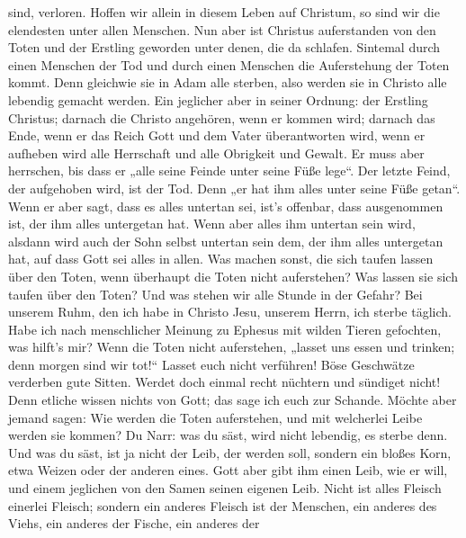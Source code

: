 sind, verloren.  Hoffen wir allein in diesem Leben auf
Christum, so sind wir die elendesten unter allen Menschen.
 Nun aber ist Christus auferstanden von den Toten und der
Erstling geworden unter denen, die da schlafen.  Sintemal
durch einen Menschen der Tod und durch einen Menschen die Auferstehung
der Toten kommt.  Denn gleichwie sie in Adam alle
sterben, also werden sie in Christo alle lebendig gemacht werden.
 Ein jeglicher aber in seiner Ordnung: der Erstling
Christus; darnach die Christo angehören, wenn er kommen wird;
 darnach das Ende, wenn er das Reich Gott und dem Vater
überantworten wird, wenn er aufheben wird alle Herrschaft und alle
Obrigkeit und Gewalt.  Er muss aber herrschen, bis dass
er „alle seine Feinde unter seine Füße lege``.  Der
letzte Feind, der aufgehoben wird, ist der Tod.  Denn „er
hat ihm alles unter seine Füße getan``. Wenn er aber sagt, dass es alles
untertan sei, ist's offenbar, dass ausgenommen ist, der ihm alles
untergetan hat.  Wenn aber alles ihm untertan sein wird,
alsdann wird auch der Sohn selbst untertan sein dem, der ihm alles
untergetan hat, auf dass Gott sei alles in allen.  Was
machen sonst, die sich taufen lassen über den Toten, wenn überhaupt die
Toten nicht auferstehen? Was lassen sie sich taufen über den Toten?
 Und was stehen wir alle Stunde in der Gefahr?
 Bei unserem Ruhm, den ich habe in Christo Jesu, unserem
Herrn, ich sterbe täglich.  Habe ich nach menschlicher
Meinung zu Ephesus mit wilden Tieren gefochten, was hilft's mir? Wenn
die Toten nicht auferstehen, „lasset uns essen und trinken; denn morgen
sind wir tot!{}``  Lasset euch nicht verführen! Böse
Geschwätze verderben gute Sitten.  Werdet doch einmal
recht nüchtern und sündiget nicht! Denn etliche wissen nichts von Gott;
das sage ich euch zur Schande.  Möchte aber jemand sagen:
Wie werden die Toten auferstehen, und mit welcherlei Leibe werden sie
kommen?  Du Narr: was du säst, wird nicht lebendig, es
sterbe denn.  Und was du säst, ist ja nicht der Leib, der
werden soll, sondern ein bloßes Korn, etwa Weizen oder der anderen
eines.  Gott aber gibt ihm einen Leib, wie er will, und
einem jeglichen von den Samen seinen eigenen Leib.  Nicht
ist alles Fleisch einerlei Fleisch; sondern ein anderes Fleisch ist der
Menschen, ein anderes des Viehs, ein anderes der Fische, ein anderes der
